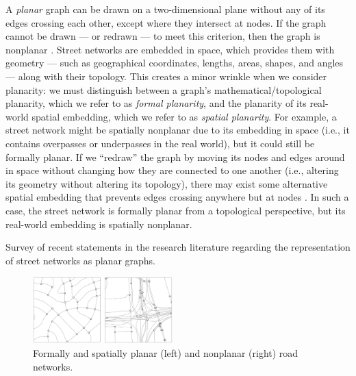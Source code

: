 \documentclass[Afour,sageh,times]{sagej}
\begin{document}
A \emph{planar} graph can be drawn on a two-dimensional plane without any of its edges crossing each other, except where they intersect at nodes. If the graph cannot be drawn --- or redrawn --- to meet this criterion, then the graph is nonplanar \citep{trudeau_introduction_1994}. Street networks are embedded in space, which provides them with geometry --- such as geographical coordinates, lengths, areas, shapes, and angles --- along with their topology. This creates a minor wrinkle when we consider planarity: we must distinguish between a graph's mathematical/topological planarity, which we refer to as \emph{formal planarity}, and the planarity of its real-world spatial embedding, which we refer to as \emph{spatial planarity}. For example, a street network might be spatially nonplanar due to its embedding in space (i.e., it contains overpasses or underpasses in the real world), but it could still be formally planar. If we \enquote{redraw} the graph by moving its nodes and edges around in space without changing how they are connected to one another (i.e., altering its geometry without altering its topology), there may exist some alternative spatial embedding that prevents edges crossing anywhere but at nodes \citep[p.~6]{barthelemy_morphogenesis_2017}. In such a case, the street network is formally planar from a topological perspective, but its real-world embedding is spatially nonplanar.

\begin{table}[htbp]
	\centering
	\caption{Survey of recent statements in the research literature regarding the representation of street networks as planar graphs.}
	\label{tab:planar_quotes}
	
\end{table}

\begin{figure}[tbp]
	\center
	\includegraphics[width=0.48\textwidth]{figures_tables/planar_vs_not.png}
	\caption{Formally and spatially planar (left) and nonplanar (right) road networks.}
	\label{fig:planar_vs_not}
\end{figure}
\end{document}

